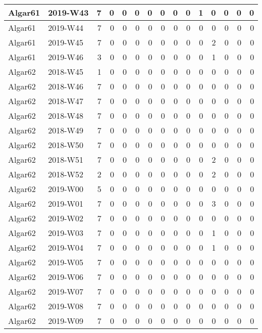 \documentclass[]{book}
\begin{document}
\begin{table}
\begin{tabular}[t]{l|l|r|r|r|r|r|r|r|r|r|r|r|r|r}
\hline
Algar61 & 2019-W43 & 7 & 0 & 0 & 0 & 0 & 0 & 0 & 0 & 1 & 0 & 0 & 0 & 0\\
\hline
Algar61 & 2019-W44 & 7 & 0 & 0 & 0 & 0 & 0 & 0 & 0 & 0 & 0 & 0 & 0 & 0\\
\hline
Algar61 & 2019-W45 & 7 & 0 & 0 & 0 & 0 & 0 & 0 & 0 & 0 & 2 & 0 & 0 & 0\\
\hline
Algar61 & 2019-W46 & 3 & 0 & 0 & 0 & 0 & 0 & 0 & 0 & 0 & 1 & 0 & 0 & 0\\
\hline
Algar62 & 2018-W45 & 1 & 0 & 0 & 0 & 0 & 0 & 0 & 0 & 0 & 0 & 0 & 0 & 0\\
\hline
Algar62 & 2018-W46 & 7 & 0 & 0 & 0 & 0 & 0 & 0 & 0 & 0 & 0 & 0 & 0 & 0\\
\hline
Algar62 & 2018-W47 & 7 & 0 & 0 & 0 & 0 & 0 & 0 & 0 & 0 & 0 & 0 & 0 & 0\\
\hline
Algar62 & 2018-W48 & 7 & 0 & 0 & 0 & 0 & 0 & 0 & 0 & 0 & 0 & 0 & 0 & 0\\
\hline
Algar62 & 2018-W49 & 7 & 0 & 0 & 0 & 0 & 0 & 0 & 0 & 0 & 0 & 0 & 0 & 0\\
\hline
Algar62 & 2018-W50 & 7 & 0 & 0 & 0 & 0 & 0 & 0 & 0 & 0 & 0 & 0 & 0 & 0\\
\hline
Algar62 & 2018-W51 & 7 & 0 & 0 & 0 & 0 & 0 & 0 & 0 & 0 & 2 & 0 & 0 & 0\\
\hline
Algar62 & 2018-W52 & 2 & 0 & 0 & 0 & 0 & 0 & 0 & 0 & 0 & 2 & 0 & 0 & 0\\
\hline
Algar62 & 2019-W00 & 5 & 0 & 0 & 0 & 0 & 0 & 0 & 0 & 0 & 0 & 0 & 0 & 0\\
\hline
Algar62 & 2019-W01 & 7 & 0 & 0 & 0 & 0 & 0 & 0 & 0 & 0 & 3 & 0 & 0 & 0\\
\hline
Algar62 & 2019-W02 & 7 & 0 & 0 & 0 & 0 & 0 & 0 & 0 & 0 & 0 & 0 & 0 & 0\\
\hline
Algar62 & 2019-W03 & 7 & 0 & 0 & 0 & 0 & 0 & 0 & 0 & 0 & 1 & 0 & 0 & 0\\
\hline
Algar62 & 2019-W04 & 7 & 0 & 0 & 0 & 0 & 0 & 0 & 0 & 0 & 1 & 0 & 0 & 0\\
\hline
Algar62 & 2019-W05 & 7 & 0 & 0 & 0 & 0 & 0 & 0 & 0 & 0 & 0 & 0 & 0 & 0\\
\hline
Algar62 & 2019-W06 & 7 & 0 & 0 & 0 & 0 & 0 & 0 & 0 & 0 & 0 & 0 & 0 & 0\\
\hline
Algar62 & 2019-W07 & 7 & 0 & 0 & 0 & 0 & 0 & 0 & 0 & 0 & 0 & 0 & 0 & 0\\
\hline
Algar62 & 2019-W08 & 7 & 0 & 0 & 0 & 0 & 0 & 0 & 0 & 0 & 0 & 0 & 0 & 0\\
\hline
Algar62 & 2019-W09 & 7 & 0 & 0 & 0 & 0 & 0 & 0 & 0 & 0 & 0 & 0 & 0 & 0\\

\end{tabular}
\end{table}
\end{document}
